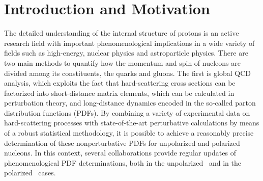 \section{Introduction and Motivation}

The detailed understanding of the internal structure of protons is an active
research field with important phenomenological implications in a wide variety of fields
such as high-energy, nuclear physics and astroparticle physics.
%
There are two main methods to quantify how the momentum and spin of nucleons
are divided among its constituents, the quarks and gluons.
%
The first is global QCD analysis, which exploits the fact that hard-scattering
cross sections can be factorized into short-distance matrix elements, which can
be calculated in perturbation theory, and long-distance dynamics encoded in the
so-called parton distribution functions (PDFs).
%
By combining a variety of experimental data on hard-scattering processes
with state-of-the-art perturbative calculations by means of a robust statistical
methodology, it is possible to achieve a reasonably precise determination
of these nonperturbative PDFs for unpolarized and polarized nucleons.
%
In this context, several collaborations provide regular updates of
phenomenological PDF determinations, both
in the unpolarized~\cite{Ball:2012cx,Ball:2014uwa,Harland-Lang:2014zoa,
Dulat:2015mca,Alekhin:2017kpj,Owens:2012bv} and in
the polarized~\cite{Nocera:2014gqa,deFlorian:2009vb} cases.

